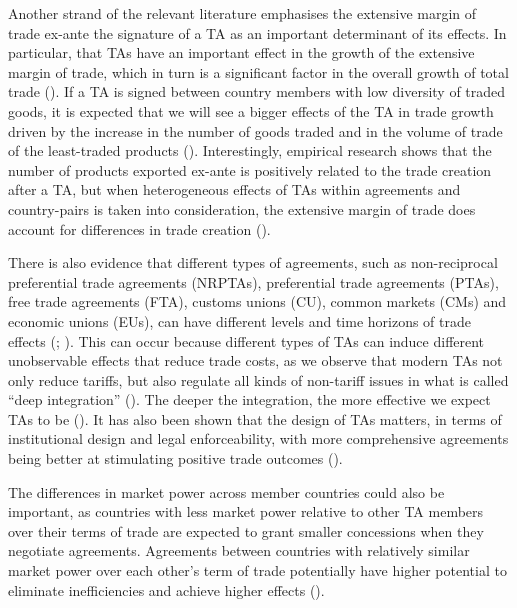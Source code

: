 Another strand of the relevant literature emphasises the extensive
margin of trade ex-ante the signature of a TA as an important
determinant of its effects. In particular, that TAs have an important
effect in the growth of the extensive margin of trade, which in turn is
a significant factor in the overall growth of total trade (\cite{kehoe_how_2013}). If a TA is signed between country members with low
diversity of traded goods, it is expected that we will see a bigger
effects of the TA in trade growth driven by the increase in the number
of goods traded and in the volume of trade of the least-traded products
(\cite{kehoe_using_2015}). Interestingly, empirical research shows that the
number of products exported ex-ante is positively related to the trade
creation after a TA, but when heterogeneous effects of TAs within
agreements and country-pairs is taken into consideration, the extensive
margin of trade does account for differences in trade creation (\cite{baier_widely_2019}).

There is also evidence that different types of agreements, such as
non-reciprocal preferential trade agreements (NRPTAs), preferential
trade agreements (PTAs), free trade agreements (FTA), customs unions
(CU), common markets (CMs) and economic unions (EUs), can have different
levels and time horizons of trade effects (\cite{baier_economic_2014}; \cite{magee_new_2008-1}). This can occur because different types of TAs can induce
different unobservable effects that reduce trade costs, as we observe
that modern TAs not only reduce tariffs, but also regulate all kinds of
non-tariff issues in what is called ``deep integration'' (\cite{anderson_terms_2016}). The deeper the integration, the more effective we expect
TAs to be (\cite{kohl_we_2014}). It has also been shown that the design of TAs
matters, in terms of institutional design and legal enforceability, with
more comprehensive agreements being better at stimulating positive trade
outcomes (\cite{kohl_trade_2013}).

The differences in market power across member countries could also be
important, as countries with less market power relative to other TA
members over their terms of trade are expected to grant smaller
concessions when they negotiate agreements. Agreements between countries
with relatively similar market power over each other's term of trade
potentially have higher potential to eliminate inefficiencies and
achieve higher effects (\cite{baier_widely_2019}).

